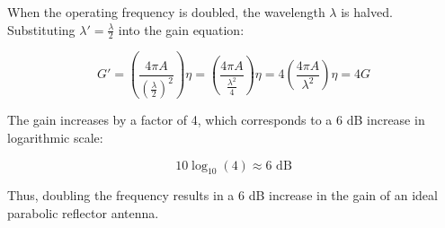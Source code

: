 When the operating frequency is doubled, the wavelength \( \lambda \) is halved. Substituting \( \lambda' = \frac{\lambda}{2} \) into the gain equation:

\[
G' = \left( \frac{4 \pi A}{\left( \frac{\lambda}{2} \right)^2} \right) \eta = \left( \frac{4 \pi A}{\frac{\lambda^2}{4}} \right) \eta = 4 \left( \frac{4 \pi A}{\lambda^2} \right) \eta = 4G
\]

The gain increases by a factor of 4, which corresponds to a 6 dB increase in logarithmic scale:

\[
10 \log_{10}(4) \approx 6 \text{ dB}
\]

Thus, doubling the frequency results in a 6 dB increase in the gain of an ideal parabolic reflector antenna.


